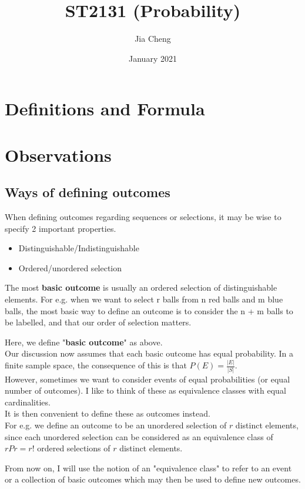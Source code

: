 \documentclass{article}
\title{ST2131 (Probability)}
\author{Jia Cheng}
\date{January 2021}
\begin{document}
\maketitle

\section{Definitions and Formula}


\section{Observations}
\subsection{Ways of defining outcomes}
When defining outcomes regarding sequences or selections, it may be wise to specify 2 important properties.
\begin{itemize}
	\item Distinguishable/Indistinguishable
	\item Ordered/unordered selection
\end{itemize}
The most \textbf{basic outcome} is usually an ordered selection of distinguishable elements. For e.g. when we want to select r balls from n red balls and m blue balls, the most basic way to define an outcome is to consider the n + m balls to be labelled, and that our order of selection matters.

Here, we define "\textbf{basic outcome}" as above.\\
Our discussion now assumes that each basic outcome has equal probability. In a finite sample space, the consequence of this is that $P(E)=\frac{|E|}{|S|}$.\\
However, sometimes we want to consider events of equal probabilities (or equal number of outcomes). I like to think of these as equivalence classes with equal cardinalities.\\
It is then convenient to define these as outcomes instead.\\
For e.g. we define an outcome to be an unordered selection of $r$ distinct elements, since each unordered selection can be considered as an equivalence class of $rPr=r!$ ordered selections of $r$ distinct elements.

From now on, I will use the notion of an "equivalence class" to refer to an event or a collection of basic outcomes which may then be used to define new outcomes.
\end{document}
